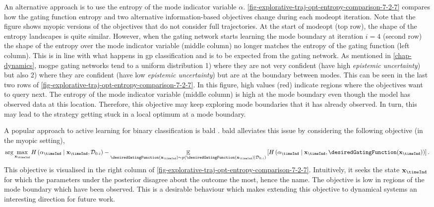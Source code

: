 \documentclass{mimosis-class/mimosis}
\numberwithin{equation}{chapter}
\DeclareMathOperator{\E}{\mathbb{E}}
\newcommand{\state}{\ensuremath{\mathbf{x}}}
\newcommand{\dataset}{\ensuremath{\mathcal{D}}}
\newcommand{\modeVar}{\ensuremath{\alpha}}
\begin{document}
{An alternative approach is to use the entropy of the mode indicator variable \(\modeVar\).
\cref{fig-explorative-traj-opt-entropy-comparison-7-2-7} compares how the gating function entropy and two
alternative information-based objectives change during each \acrshort{modeopt} iteration.
Note that the figure shows myopic versions of the objectives that do not consider full trajectories.
At the start of \acrshort{modeopt} (top row), the shape of the entropy landscapes is quite similar.
However, when the gating network starts learning the mode boundary at iteration \(i=4\) (second row)
the shape of the entropy over the mode indicator variable (middle column)
no longer matches the entropy of the gating function (left column).
This is in line with what happens in \acrshort{gp} classification and is to be expected from the gating network.
As mentioned in \cref{chap-dynamics}, \acrshort{mogpe} gating networks tend to a uniform distribution 1)
where they are not very confident (have high \emph{epistemic uncertainty}) but also 2) where they are confident
(have low \emph{epistemic uncertainty}) but are at the boundary between modes.
This can be seen in the last two rows of \cref{fig-explorative-traj-opt-entropy-comparison-7-2-7}.
In this figure, high values (red) indicate regions where the objectives want to query next.
The entropy of the mode indicator variable (middle column) is high at the mode boundary even though the model
has observed data at this location.
Therefore, this objective may keep exploring mode boundaries that it has already observed.
In turn, this may lead to the strategy getting stuck in a local optimum at a mode boundary.

A popular approach to active learning for binary classification is \acrfull{bald}
\citep{houlsbyBayesian2011}.
\acrshort{bald} alleviates this issue by considering the following objective (in the myopic setting),
\begin{align} \label{eq-bald}
\arg \max_{\state_{\timeInd}}
H\left(\modeVar_{\timeInd} \mid \state_{\timeInd}, \dataset_{0:i} \right) -
\E_{\desiredGatingFunction(\state_{\timeInd}) \sim p(\desiredGatingFunction(\state_{\timeInd}) \mid \dataset_{0:i}) }
\left[
H\left(\modeVar_{\timeInd} \mid \state_{\timeInd}, \desiredGatingFunction(\state_{\timeInd}) \right)
\right].
\end{align}
This objective is visualised in the right column of  \cref{fig-explorative-traj-opt-entropy-comparison-7-2-7}.
Intuitively, it seeks the state \(\state_{\timeInd}\) for which the parameters under the posterior
disagree about the outcome the most, hence the name.
The objective is low in regions of the mode boundary which have been observed.
This is a desirable behaviour which makes
extending this objective to dynamical systems an interesting direction for future work.

}
\end{document}
